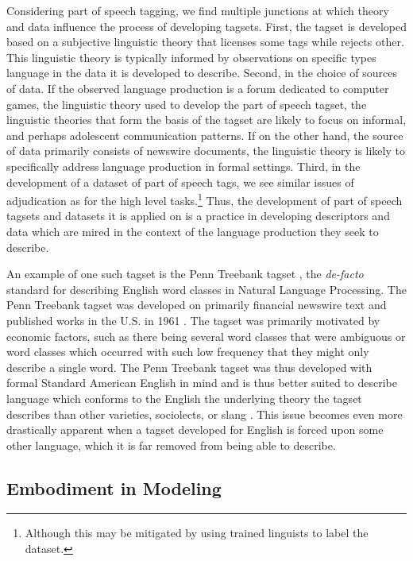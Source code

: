 Considering part of speech tagging, we find multiple junctions at which theory and data influence the process of developing tagsets. First, the tagset is developed based on a subjective linguistic theory that licenses some tags while rejects other. This linguistic theory is typically informed by observations on specific types language in the data it is developed to describe. Second, in the choice of sources of data. If the observed language production is a forum dedicated to computer games, the linguistic theory used to develop the part of speech tagset, the linguistic theories that form the basis of the tagset are likely to focus on informal, and perhaps adolescent communication patterns. If on the other hand, the source of data primarily consists of newswire documents, the linguistic theory is likely to specifically address language production in formal settings. Third, in the development of a dataset of part of speech tags, we see similar issues of adjudication as for the high level tasks.\footnote{Although this may be mitigated by using trained linguists to label the dataset.}
Thus, the development of part of speech tagsets and datasets it is applied on is a practice in developing descriptors and data which are mired in the context of the language production they seek to describe.

An example of one such tagset is the Penn Treebank tagset \cite{Marcus:1993}, the \textit{de-facto} standard for describing English word classes in Natural Language Processing. The Penn Treebank tagset was developed on primarily financial newswire text and published works in the U.S. in 1961 \cite{Francis:1982}. The tagset was primarily motivated by economic factors, such as there being several word classes that were ambiguous or word classes which occurred with such low frequency that they might only describe a single word. The Penn Treebank tagset was thus developed with formal Standard American English in mind and is thus better suited to describe language which conforms to the English the underlying theory the tagset describes than other varieties, sociolects, or slang \cite{Jorgensen:2016}.
This issue becomes even more drastically apparent when a tagset developed for English is forced upon some other language, which it is far removed from being able to describe.

\subsection{Embodiment in Modeling}

